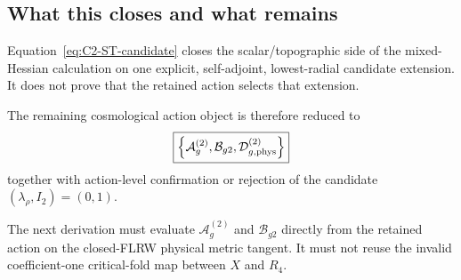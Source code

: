 \subsection{What this closes and what remains}

Equation~\eqref{eq:C2-ST-candidate} closes the scalar/topographic side of the
mixed-Hessian calculation on one explicit, self-adjoint, lowest-radial
candidate extension.  It does not prove that the retained action selects that
extension.

The remaining cosmological action object is therefore reduced to
\begin{equation}
\boxed{
\left\{
\mathcal A_g^{(2)},
\mathcal B_{g2},
\mathcal D_{g,\rm phys}^{(2)}
\right\}
}
\label{eq:remaining-metric-data}
\end{equation}
together with action-level confirmation or rejection of the candidate
$(\lambda_\rho,I_2)=(0,1)$.

The next derivation must evaluate
$\mathcal A_g^{(2)}$ and $\mathcal B_{g2}$ directly from the retained action on
the closed-FLRW physical metric tangent.  It must not reuse the invalid
coefficient-one critical-fold map between $X$ and $R_4$.

